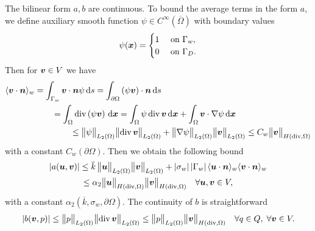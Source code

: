 The bilinear form $a,b$ are continuous. To bound the average terms in the form $a$,
we define auxiliary smooth function $\psi\in C^{\infty}(\overbar\Omega)$ with boundary values
\begin{equation*}
  \psi(\mathbf{\boldsymbol{x}}) =
  \begin{cases}
    1 & \textrm{ on } \Gamma_w, \\
    0 & \textrm{ on } \Gamma_D.
  \end{cases} \nonumber
\end{equation*}
Then for $\mathbf{\boldsymbol{v}}\in V$ we have
\begin{align*}
  \langle\mathbf{\boldsymbol{v}} \cdot\mathbf{\boldsymbol{n}}\rangle_w = \int_{\Gamma_w} \mathbf{\boldsymbol{v}} \cdot\mathbf{\boldsymbol{n}} \psi \,{\rm d} s = 
    \int_{\partial\Omega} \left( \psi \mathbf{\boldsymbol{v}} \right) \cdot\mathbf{\boldsymbol{n}} \,{\rm d} s & \\
    = \int_{\Omega} {\rm div}\left( \psi \mathbf{\boldsymbol{v}} \right) \,{\rm d}\mathbf{\boldsymbol{x}}
    = \int_{\Omega} \psi\, {\rm div}\, &\mathbf{\boldsymbol{v}} \,{\rm d}\mathbf{\boldsymbol{x}} + \int_{\Omega} \mathbf{\boldsymbol{v}} \cdot \nabla\psi \,{\rm d}\mathbf{\boldsymbol{x}} \\
    \leq \bigl\Vert\psi\bigr\Vert_{L_2(\Omega)} \bigl\Vert{\rm div}\,\mathbf{\boldsymbol{v}}\bigr\Vert_{L_2(\Omega)}& + \bigl\Vert\nabla\psi\bigr\Vert_{L_2(\Omega)} \bigl\Vert\mathbf{\boldsymbol{v}}\bigr\Vert_{L_2(\Omega)}
    \leq C_w \bigl\Vert\mathbf{\boldsymbol{v}}\bigr\Vert_{H({\rm div},\Omega)}
\end{align*}
with a constant $C_w(\partial\Omega)$. Then we obtain the following bound
\begin{multline} \label{eqn:form_a_bound}
    \abs{a(\vc u,\vc v)} \leq \overbar{k}\, \norm{\vc u}_{L_2(\Omega)} \norm{\vc v}_{L_2(\Omega)}
        + \abs{\sigma_w} \abs{\Gamma_w} \avg{\vc u\cdot\vc n}_w \avg{\vc v\cdot\vc n}_w\\
        \leq \alpha_2 \norm{\vc u}_{H(\div,\Omega)} \norm{\vc v}_{H(\div,\Omega)} \quad \forall \vc u,\vc v\in V,
\end{multline}
with a constant $\alpha_2 \left(\overbar{k}, \sigma_w, \partial\Omega\right)$.
The continuity of $b$ is straightforward
\begin{equation} \label{eqn:form_b_bound}
    \left|b(\mathbf{\boldsymbol{v}},p)\right| \leq \bigl\Vert p\bigr\Vert_{L_2(\Omega)} \bigl\Vert{\rm div}\,\mathbf{\boldsymbol{v}}\bigr\Vert_{L_2(\Omega)}
        \leq \bigl\Vert p\bigr\Vert_{L_2(\Omega)} \bigl\Vert\mathbf{\boldsymbol{v}}\bigr\Vert_{H({\rm div},\Omega)} \quad \forall q\in Q,\;\forall \mathbf{\boldsymbol{v}}\in V.
\end{equation}

